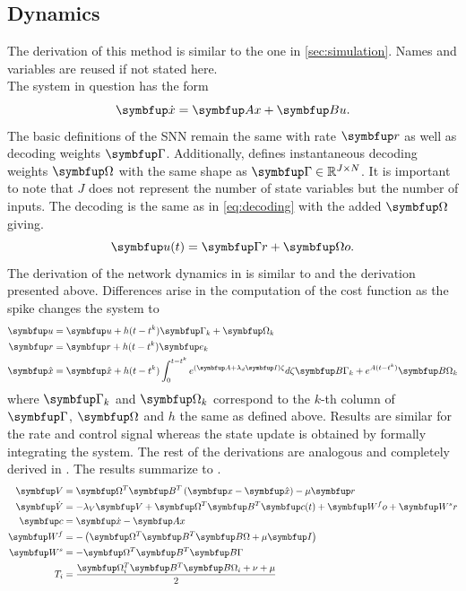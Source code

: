 \subsection{Dynamics}\label{ssec:control_dynamics}
The derivation of this method is similar to the one in \cref{sec:simulation}. Names and variables are reused if not stated here.\\
The system in question has the form
\begin{equation}\label{eq:contsys}
	\bmu{\dot{x}} = \bmu{Ax} + \bmu{Bu}.
\end{equation}
The basic definitions of the \ac{SNN} remain the same with rate $\bmu{r}$ as well as decoding weights $\bmu{\Gamma}$. Additionally, \cite{huang_optimizing_2017} defines instantaneous decoding weights $\bmu{\Omega}$ with the same shape as $\bmu{\Gamma}\in \mathbb{R}^{J\times N}$. It is important to note that $J$ does not represent the number of state variables but the number of inputs. The decoding is the same as in \cref{eq:decoding} with the added $\bmu{\Omega}$ giving.
\begin{equation}\label{eq:control_signal_comp}
	\bmu{u}(t) = \bmu{\Gamma r} + \bmu{\Omega o}.
\end{equation}
The derivation of the network dynamics in \cite{huang_dynamics_2019} is similar to \cite{boerlin_predictive_2013} and the derivation presented above. Differences arise in the computation of the cost function as the spike changes the system to
\begin{equation}\label{eq:control_spike_change}
	\begin{aligned}
	\bmu{u} &= \bmu{u} + h(t-t^k)\bmu{\Gamma}_k + \bmu{\Omega}_k\\
	\bmu{r} &= \bmu{r} + h(t-t^k)\bmu{e}_k\\
	\bmu{\hat{x}} &= \bmu{\hat{x}} + h(t-t^k)\int_{0}^{t-t^k}e^{(\bmu{A}+\lambda_d\bmu{I})\zeta}d\zeta \bmu{B\Gamma}_k + e^{A(t-t^k)}\bmu{B\Omega}_k
	\end{aligned}
\end{equation}
where $\bmu{\Gamma}_k$ and $\bmu{\Omega}_k$ correspond to the $k$-th column of $\bmu{\Gamma}$, $\bmu{\Omega}$ and $h$ the same as defined above. Results are similar for the rate and control signal whereas the state update is obtained by formally integrating the system. The rest of the derivations are analogous and completely derived in \cite{huang_optimizing_2017}. The results summarize to .
\begin{align}
	\bmu{V} &= \bmu{\Omega}^T\bmu{B}^T\left(\bmu{x} -\bmu{\hat{x}}\right) - \mu \bmu{r}\label{eq:control_dyn_begin}\\
	\bmu{\dot{V}} &= -\lambda_V\bmu{V} + \bmu{\Omega}^T \bmu{B}^T \bmu{c}(t) + \bmu{W^fo} + \bmu{W^sr}\label{eq:control_dyn_2}\\
	\bmu{c} &= \bmu{\dot{x}} - \bmu{Ax}\\\label{eq:feeback_c}
	\bmu{W^f} &= - \left(\bmu{\Omega}^T\bmu{B}^T\bmu{B\Omega} + \mu\bmu{I}\right)\\
	\bmu{W^s} &= -\bmu{\Omega}^T\bmu{B}^T\bmu{B\Gamma}\label{eq:Ws_wrong}\\
	T_i &= \frac{\bmu{\Omega}_i^T\bmu{B}^T\bmu{B\Omega}_i + \nu  + \mu}{2}
	\label{eq:control_dyn_end}
\end{align}
